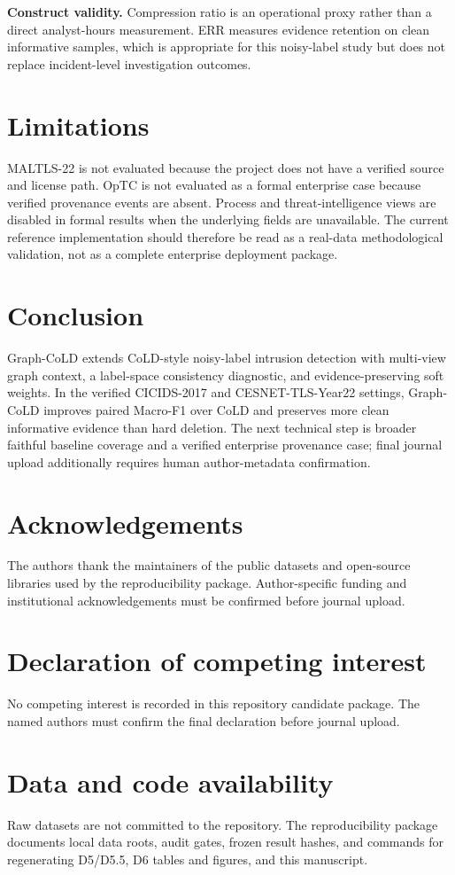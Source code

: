 \documentclass[preprint,review,12pt]{elsarticle}
\begin{document}
\textbf{Construct validity.} Compression ratio is an operational proxy rather
than a direct analyst-hours measurement. ERR measures evidence retention on clean
informative samples, which is appropriate for this noisy-label study but does
not replace incident-level investigation outcomes.

\section{Limitations}
MALTLS-22 is not evaluated because the project does not have a verified source
and license path. OpTC is not evaluated as a formal enterprise case because
verified provenance events are absent. Process and threat-intelligence views are
disabled in formal results when the underlying fields are unavailable. The
current reference implementation should therefore be read as a real-data
methodological validation, not as a complete enterprise deployment package.

\section{Conclusion}
Graph-CoLD extends CoLD-style noisy-label intrusion detection with multi-view
graph context, a label-space consistency diagnostic, and evidence-preserving
soft weights. In the verified CICIDS-2017 and CESNET-TLS-Year22 settings,
Graph-CoLD improves paired Macro-F1 over CoLD and preserves more clean
informative evidence than hard deletion. The next technical step is broader faithful baseline coverage and a verified
enterprise provenance case; final journal upload additionally requires human
author-metadata confirmation.

\section*{Acknowledgements}
The authors thank the maintainers of the public datasets and open-source
libraries used by the reproducibility package. Author-specific funding and
institutional acknowledgements must be confirmed before journal upload.

\section*{Declaration of competing interest}
No competing interest is recorded in this repository candidate package. The named
authors must confirm the final declaration before journal upload.

\section*{Data and code availability}
Raw datasets are not committed to the repository. The reproducibility package
documents local data roots, audit gates, frozen result hashes, and commands for
regenerating D5/D5.5, D6 tables and figures, and this manuscript.



\end{document}
